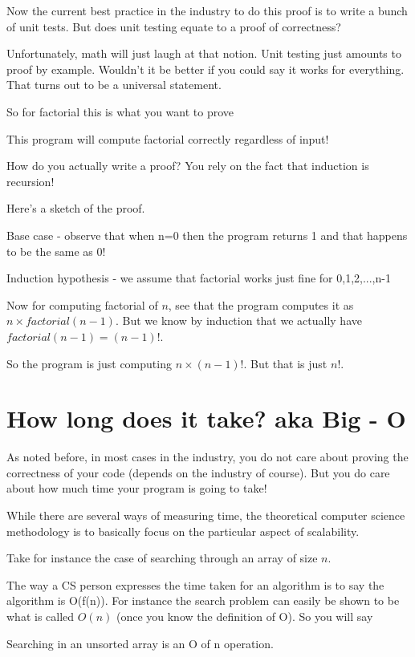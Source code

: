 \documentclass[12pt]{article}
\begin{document}
Now the current best practice in the industry to do this proof is to write a bunch of unit tests. But does unit testing equate to a proof of correctness?

Unfortunately, math will just laugh at that notion. Unit testing just amounts to proof by example. Wouldn't it be better if you could say it works for everything. That turns out to be a universal statement.

\medskip

So for factorial this is what you want to prove

This program will compute factorial correctly regardless of input! 

How do you actually write a proof? You rely on the fact that induction is recursion!

Here's a sketch of the proof.

Base case - observe that when n=0 then the program returns 1 and that happens to be the same as 0!

Induction hypothesis - we assume that factorial works just fine for 0,1,2,...,n-1

Now for computing factorial of $n$, see that the program computes it as $n \times factorial(n-1)$. But we know by induction that we actually have $factorial(n-1) = (n-1)!$.

So the program is just computing $n \times (n-1)!$. But that is just $n!$.

\section*{How long does it take? aka Big - O}

As noted before, in most cases in the industry, you do not care about proving the correctness of your code (depends on the industry of course). But you do care about how much time your program is going to take!

While there are several ways of measuring time, the theoretical computer science methodology is to basically focus on the particular aspect of scalability. 

Take for instance the case of searching through an array of size $n$.

The way a CS person expresses the time taken for an algorithm is to say the algorithm is O(f(n)). For instance the search problem can easily be shown to be what is called $O(n)$ (once you know the definition of O). So you will say 

Searching in an unsorted array is an O of n operation. 
\end{document}
